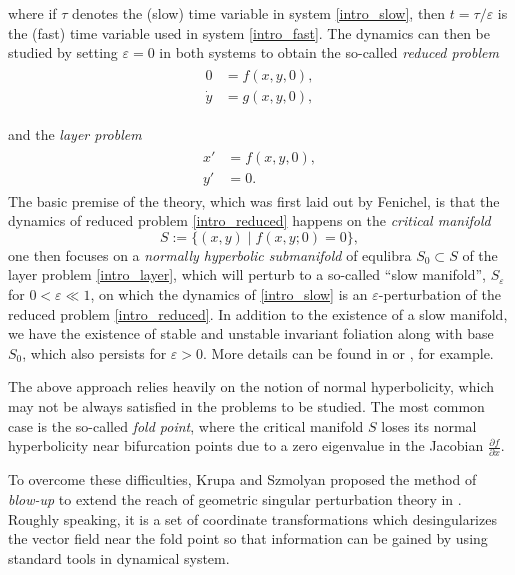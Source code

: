 \documentclass[letterpaper,11pt]{article}
\newcommand{\eps}{\varepsilon}
\numberwithin{equation}{section}
\theoremstyle{plain}
\begin{document}
where if $\tau$ denotes the (slow) time variable in system \eqref{intro_slow}, then $t = \tau/\eps$ is the (fast) time variable used in system \eqref{intro_fast}. The dynamics can then be studied by setting $\eps = 0$ in both systems to obtain the so-called \textit{reduced problem}
\begin{align}\label{intro_reduced}
\begin{split}
0 &=  f(x,y,0),\\
\dot{y} &=   g(x,y,0),   
\end{split}
\end{align}

and the \textit{layer problem}
\begin{align}\label{intro_layer}
\begin{split}
x' &=  f(x,y,0),\\
y' &=  0. 
\end{split}
\end{align}
The basic premise of the theory, which was first laid out by Fenichel, is that the dynamics of reduced problem \eqref{intro_reduced} happens on the \textit{critical manifold}
\[
S:=  \{ (x,y) \mid f(x,y;0) = 0 \},
\]
one then focuses on a \textit{normally hyperbolic submanifold} of equlibra $S_0 \subset S$ of the layer problem \eqref{intro_layer}, which will perturb to a so-called ``slow manifold'', $S_\eps$ for $0<\eps \ll 1$, on which the dynamics of \eqref{intro_slow} is an $\eps$-perturbation of the reduced problem \eqref{intro_reduced}. In addition to the existence of a slow manifold, we have the existence of stable and unstable invariant foliation along with base $S_0$, which also persists for $\eps>0$. More details can be found in \cite{Jones_GSPT} or \cite{chris_kuehn_book}, for example.

The above approach relies heavily on the notion of normal hyperbolicity, which may not be always satisfied in the problems to be studied. The most common case is the so-called \textit{fold point}, where the critical manifold $S$ loses its normal hyperbolicity near bifurcation points due to a zero eigenvalue in the Jacobian $\frac{\partial f }{\partial x}$.

To overcome these difficulties, Krupa and Szmolyan proposed the method of \textit{blow-up} to extend the reach of geometric singular perturbation theory in \cite{KrupaSz}. Roughly speaking, it is a set of coordinate transformations which desingularizes the vector field near the fold point so that information can be gained by using standard tools in dynamical system.
\end{document}
